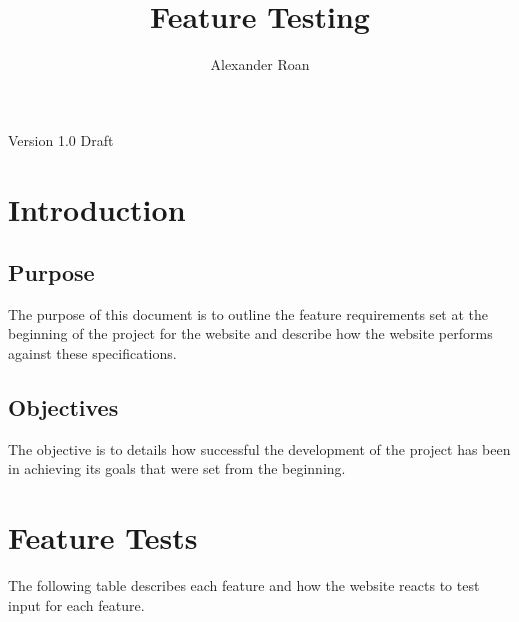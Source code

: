 \documentclass[11pt]{article}
\begin{document}
\begin{titlepage}
\title{Feature Testing}
\author{Alexander Roan}
\maketitle
\begin{center}
Version 1.0 Draft
\end{center}
\end{titlepage}

\tableofcontents
\newpage
\section{Introduction}
\subsection{Purpose}
The purpose of this document is to outline the feature requirements set at the beginning of the project for the website and describe how the website performs against these specifications.

\subsection{Objectives}
The objective is to details how successful the development of the project has been in achieving its goals that were set from the beginning.

\section{Feature Tests}
The following table describes each feature and how the website reacts to test input for each feature.
\end{document}
